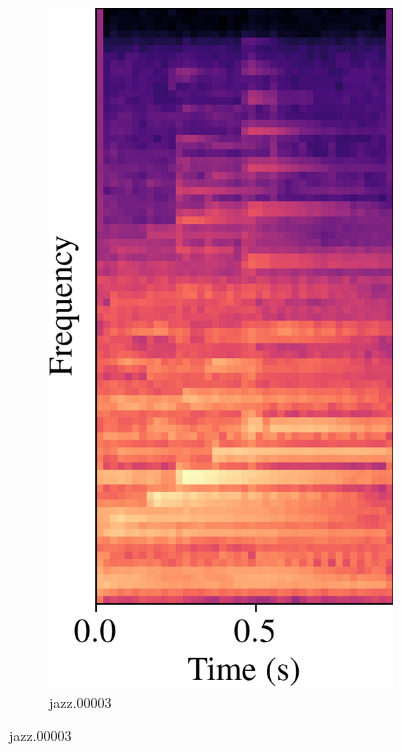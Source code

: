 \documentclass[conference]{IEEEtran}
\begin{document}
\begin{figure}[htbp]
\begin{subfigure}[b]{0.32\columnwidth}
    \end{subfigure}
    \hfill
    \begin{subfigure}[b]{0.32\columnwidth}
        \centerline{\includegraphics[width=\columnwidth]{spec_incorrect_1.png}}
        \caption{jazz.00003}
        \label{spec_incorrect_1}

\end{subfigure}
\end{figure}
\end{document}
